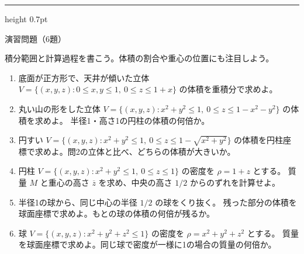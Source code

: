 \documentclass[a4paper,10pt,pdflatex,ja=standard,jafont=ipaex-type1,
  magstyle=real,scale=1]{bxjsarticle}
\newcommand{\topic}[1]{\par\vspace{5pt}%
  {\large\sffamily\mdseries\color{accent}#1}\par\vspace{2pt}}
\newenvironment{problems}
  {\begin{enumerate}[leftmargin=2em,itemsep=3pt,topsep=3pt,parsep=0pt,
    font=\color{accent}]}
  {\end{enumerate}}
\newcommand{\problemspace}{\par\vspace{5mm}}
\newcommand{\exercises}{%
  {\color{accent}\hrule height 0.7pt}\vspace{3pt}%
  \topic{演習問題（6題）}%
  {\small 積分範囲と計算過程を書こう。体積の割合や重心の位置にも注目しよう。}\par}
\begin{document}
\noindent\begin{minipage}[b][0.5\textheight][t]{\linewidth}
\exercises
\begin{problems}
\item 底面が正方形で、天井が傾いた立体
$V=\{(x,y,z):0\le x,y\le1,\ 0\le z\le1+x\}$ の体積を重積分で求めよ。
\problemspace

\item 丸い山の形をした立体
$V=\{(x,y,z):x^2+y^2\le1,\ 0\le z\le1-x^2-y^2\}$ の体積を求めよ。
半径1・高さ1の円柱の体積の何倍か。
\problemspace

\item 円すい $V=\{(x,y,z):x^2+y^2\le1,\ 0\le z\le1-\sqrt{x^2+y^2}\}$
の体積を円柱座標で求めよ。問2の立体と比べ、どちらの体積が大きいか。
\problemspace

\item 円柱 $V=\{(x,y,z):x^2+y^2\le1,\ 0\le z\le1\}$ の密度を $\rho=1+z$ とする。
質量 $M$ と重心の高さ $\overline z$ を求め、中央の高さ $1/2$ からのずれを計算せよ。
\problemspace

\item 半径1の球から、同じ中心の半径 $1/2$ の球をくり抜く。
残った部分の体積を球面座標で求めよ。もとの球の体積の何倍が残るか。
\problemspace

\item 球 $V=\{(x,y,z):x^2+y^2+z^2\le1\}$ の密度を $\rho=x^2+y^2+z^2$ とする。
質量を球面座標で求めよ。同じ球で密度が一様に1の場合の質量の何倍か。
\problemspace
\end{problems}
\end{minipage}
\end{document}
